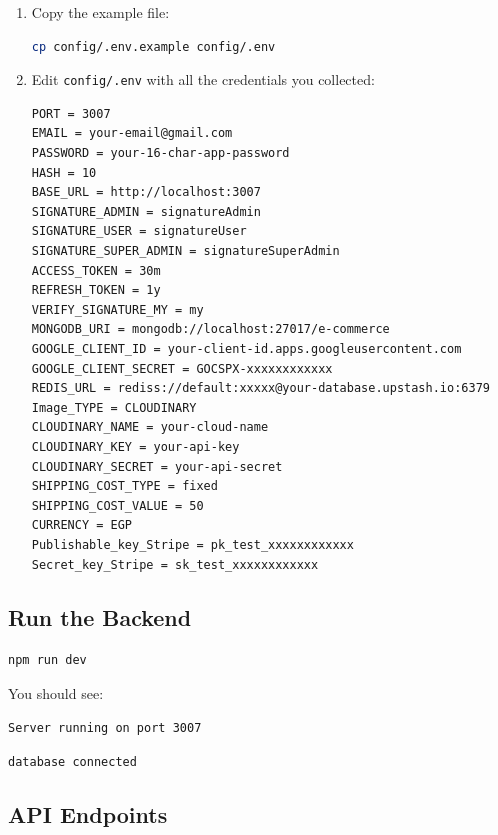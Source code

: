 \documentclass[12pt,a4paper]{article}
\begin{document}
\begin{enumerate}[leftmargin=*,itemsep=0.5em]
    \item Copy the example file:

\begin{lstlisting}[language=bash]
cp config/.env.example config/.env
\end{lstlisting}

    \item Edit \texttt{config/.env} with all the credentials you collected:

\begin{lstlisting}[caption=Complete config/.env example]
PORT = 3007
EMAIL = your-email@gmail.com
PASSWORD = your-16-char-app-password
HASH = 10
BASE_URL = http://localhost:3007
SIGNATURE_ADMIN = signatureAdmin
SIGNATURE_USER = signatureUser
SIGNATURE_SUPER_ADMIN = signatureSuperAdmin
ACCESS_TOKEN = 30m
REFRESH_TOKEN = 1y
VERIFY_SIGNATURE_MY = my
MONGODB_URI = mongodb://localhost:27017/e-commerce
GOOGLE_CLIENT_ID = your-client-id.apps.googleusercontent.com
GOOGLE_CLIENT_SECRET = GOCSPX-xxxxxxxxxxxx
REDIS_URL = rediss://default:xxxxx@your-database.upstash.io:6379
Image_TYPE = CLOUDINARY
CLOUDINARY_NAME = your-cloud-name
CLOUDINARY_KEY = your-api-key
CLOUDINARY_SECRET = your-api-secret
SHIPPING_COST_TYPE = fixed
SHIPPING_COST_VALUE = 50
CURRENCY = EGP
Publishable_key_Stripe = pk_test_xxxxxxxxxxxx
Secret_key_Stripe = sk_test_xxxxxxxxxxxx
\end{lstlisting}

\end{enumerate}

\subsection{Run the Backend}

\begin{lstlisting}[language=bash, caption=Start backend server]
npm run dev
\end{lstlisting}

\begin{tcolorbox}[colback=green!5!white,colframe=successgreen,title= Server Running]
    You should see:
    
    \texttt{Server running on port 3007}
    
    \texttt{database connected}
\end{tcolorbox}

\subsection{API Endpoints}
\end{document}
